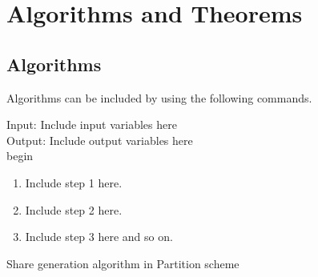 \chapter{Algorithms and Theorems}
\section{Algorithms}
Algorithms can be included by using the following commands.

\begin{algorithm}[H]
	\begin{scriptsize}
		Input: Include input variables here\\
		Output: Include output variables here \\
		begin
		\begin{enumerate}
			\item Include step 1 here. 
			\item Include step 2 here.    
			\item Include step 3 here and so on.
		\end{enumerate}
		\caption{Share generation algorithm in Partition scheme}
		\label{algo:shrgen1}
	\end{scriptsize}
\end{algorithm}
